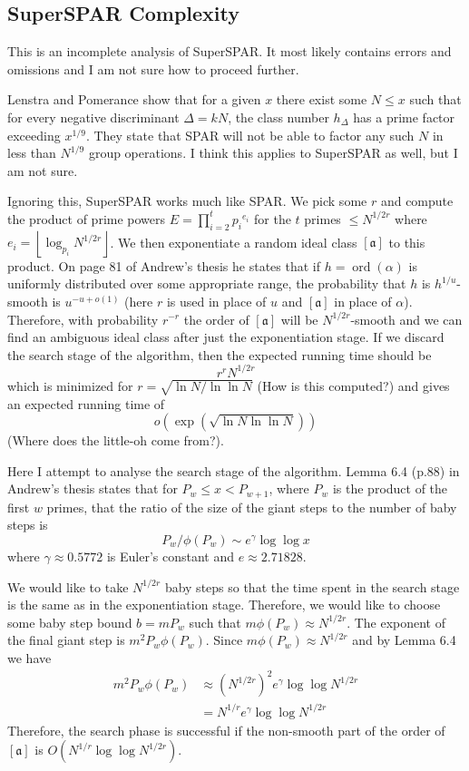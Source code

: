 \documentclass[a4paper]{article}
\DeclareMathOperator{\ord}{ord}
\newcommand{\floor}[1]{\left\lfloor #1 \right\rfloor}
\newcommand{\aclass}{[\mathfrak a]}
\begin{document}
\subsection{SuperSPAR Complexity}

This is an incomplete analysis of SuperSPAR.  It most likely contains errors and omissions and I am not sure how to proceed further.

\bigbreak
\noindent
Lenstra and Pomerance \cite[Theorem 11.1]{Lenstra1992} show that for a given $x$ there exist some $N \le x$ such that for every negative discriminant $\Delta = kN$, the class number $h_\Delta$ has a prime factor exceeding $x^{1/9}$.  They state that SPAR will not be able to factor any such $N$ in less than $N^{1/9}$ group operations.  I think this applies to SuperSPAR as well, but I am not sure.

\bigbreak
\noindent
Ignoring this, SuperSPAR works much like SPAR.  We pick some $r$ and compute the product of prime powers $E = \prod_{i=2}^t {p_i}^{e_i}$ for the $t$ primes $\le N^{1/2r}$ where $e_i = \floor{\log_{p_i} N^{1/2r}}$.  We then exponentiate a random ideal class $\aclass$ to this product.  On page 81 of Andrew's thesis \cite{Sutherland2007} he states that if $h=\ord(\alpha)$ is uniformly distributed over some appropriate range, the probability that $h$ is $h^{1/u}$-smooth is $u^{-u+o(1)}$ (here $r$ is used in place of $u$ and $\aclass$ in place of $\alpha$).  Therefore, with probability $r^{-r}$ the order of $\aclass$ will be $N^{1/2r}$-smooth and we can find an ambiguous ideal class after just the exponentiation stage.  If we discard the search stage of the algorithm, then the expected running time should be
\[
	r^r N^{1/2r}
\]
which is minimized for $r = \sqrt{\ln N / \ln \ln N}$ \cite{Schnorr1984} (How is this computed?) and gives an expected running time of
\[
	o\left(\exp\left(\sqrt{\ln N \ln \ln N} \right) \right)
\]
(Where does the little-oh come from?).

\bigbreak
\noindent
Here I attempt to analyse the search stage of the algorithm.  Lemma 6.4 (p.88) in Andrew's thesis states that for $P_w \le x < P_{w+1}$, where $P_w$ is the product of the first $w$ primes, that the ratio of the size of the giant steps to the number of baby steps is
\[
P_w / \phi(P_w) \sim e^\gamma \log \log x
\]
where $\gamma \approx 0.5772$ is Euler's constant and $e \approx 2.71828$.

We would like to take $N^{1/2r}$ baby steps so that the time spent in the search stage is the same as in the exponentiation stage.  Therefore, we would like to choose some baby step bound $b = mP_w$ such that $m\phi(P_w) \approx N^{1/2r}$.  The exponent of the final giant step is $ m^2 P_w \phi(P_w)$.  Since $m\phi(P_w) \approx N^{1/2r}$ and by Lemma 6.4 we have
\begin{align*}
m^2P_w\phi(P_w) &\approx {\left(N^{1/2r}\right)}^2 e^\gamma \log \log N^{1/2r} \\
&= N^{1/r} e^\gamma \log \log N^{1/2r}
\end{align*}
Therefore, the search phase is successful if the non-smooth part of the order of $\aclass$ is $O(N^{1/r} \log \log N^{1/2r})$.
\end{document}
